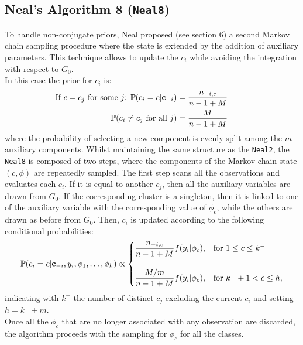 \subsection{Neal's Algorithm 8 (\texttt{Neal8})} \label{neal8}
To handle non-conjugate priors, Neal proposed (see \cite{neal} section 6) a second Markov chain sampling procedure where the state is extended by the addition of auxiliary parameters.
This technique allows to update the $c_i$ while avoiding the integration with respect to $G_0$. \\
In this case the prior for $c_i$ is:
\begin{equation}
	\begin{aligned}
		\hspace{-25pt}
		\vspace{-12pt}
		\text{If $c=c_j$ for some $j$: } \PP(c_i=c | \mathbf c_{-i}) &= \frac{n_{-i,c}}{n-1+M}   \\
		\PP(c_{i}\neq c_{j} \text{ for all } j) &=\frac{M }{n-1+M}
	\end{aligned}	
\end{equation}
where the probability of selecting a new component is evenly split among the $m$ auxiliary components.
Whilst maintaining the same structure as the \verb|Neal2|, the \verb|Neal8| is composed of two steps, where the components of the Markov chain state $(c,\phi)$ are repeatedly sampled.
The first step scans all the observations and evaluates each $c_i$.
If it is equal to another $c_j$, then all the auxiliary variables are drawn from $G_0$.
If the corresponding cluster is a singleton, then it is linked to one of the auxiliary variable with the corresponding value of $\phi_c$, while the others are drawn as before from $G_0$.
Then, $c_i$ is updated according to the following conditional probabilities:
\begin{equation}
	\begin{aligned}
		\mathbb P(c_{i}=c | \mathbf c_{-i}, y_{i}, \phi_{1},\dots,\phi_{h}) \propto
		\begin{cases}
			\dfrac{n_{-i,c}}{n-1+M}f(y_{i}|\phi_{c}), & \mbox{for } 1 \leq c \leq k^{-} \\
			\\
			\dfrac{M/m}{n-1+M}f(y_{i}|\phi_{c}), & \mbox{for } k^{-}+1 < c \leq h,
		\end{cases}
	\end{aligned}
\end{equation}
indicating with $k^{-}$ the number of distinct $c_j$ excluding the current $c_i$ and setting $h=k^{-}+m$. \\
Once all the $\phi_c$ that are no longer associated with any observation are discarded, the algorithm proceeds with the sampling for $\phi_c$ for all the classes.

